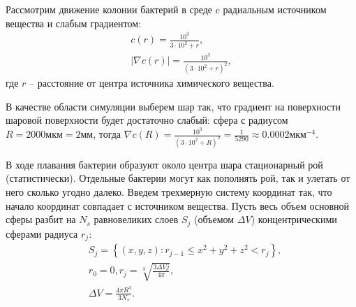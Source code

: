 Рассмотрим движение колонии бактерий в среде c радиальным источником вещества и слабым градиентом:
\begin{equation}
    \begin{aligned}
        c(r)=\frac{10^3}{3 \cdot 10^2+r},\\
        |\nabla c(r)|=\frac{10^3}{\left (3 \cdot 10^2+r \right )^2},
    \label{eq:radial-chem}
    \end{aligned}
\end{equation}
где $r$ -- расстояние от центра источника химического вещества.

В качестве области симуляции выберем шар так, что градиент на поверхности шаровой поверхности будет достаточно слабый: сфера с радиусом $R=2000 \textrm{мкм}=2 \textrm{мм}$, тогда $\nabla c(R)=\frac{10^3}{(3 \cdot 10^2+R)^2} = \frac{1}{5290} \approx 0.0002 \textrm{мкм}^{-4}$.

В ходе плавания бактерии образуют около центра шара стационарный рой (статистически). Отдельные бактерии могут как пополнять рой, так и улетать от него сколько угодно далеко. Введем трехмерную систему координат так, что начало координат совпадает с источником вещества. Пусть весь объем основной сферы разбит на $N_{s}$ равновеликих слоев $S_j$ (объемом $\Delta V$) концентрическими сферами радиуса $r_j$:
\begin{equation}
    \begin{aligned}
        &S_j=\left \{(x,y,z) : r_{j-1} \leq x^2+y^2+z^2<r_j \right \},\\
        &r_0=0, r_j=\sqrt[3]{\frac{3\Delta V j}{4\pi}},\\
        &\Delta V=\frac{4 \pi R^3}{3 N_s}.
    \label{eq:radial-spheres}
    \end{aligned}
\end{equation}

